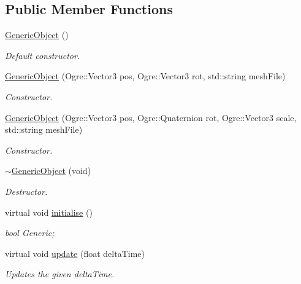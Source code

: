 \subsection*{Public Member Functions}
\begin{DoxyCompactItemize}
\item 
\hypertarget{class_objects_1_1_generic_object_abeb3e050cbd3e1458e0d73ccb5feb13b}{\hyperlink{class_objects_1_1_generic_object_abeb3e050cbd3e1458e0d73ccb5feb13b}{Generic\-Object} ()}\label{class_objects_1_1_generic_object_abeb3e050cbd3e1458e0d73ccb5feb13b}

\begin{DoxyCompactList}\small\item\em Default constructor. \end{DoxyCompactList}\item 
\hyperlink{class_objects_1_1_generic_object_af2dbae8570212439ea7c8b7dd8be5f4c}{Generic\-Object} (Ogre\-::\-Vector3 pos, Ogre\-::\-Vector3 rot, std\-::string mesh\-File)
\begin{DoxyCompactList}\small\item\em Constructor. \end{DoxyCompactList}\item 
\hyperlink{class_objects_1_1_generic_object_a3b2acd7559918edcbc74bd7d20da9763}{Generic\-Object} (Ogre\-::\-Vector3 pos, Ogre\-::\-Quaternion rot, Ogre\-::\-Vector3 scale, std\-::string mesh\-File)
\begin{DoxyCompactList}\small\item\em Constructor. \end{DoxyCompactList}\item 
\hypertarget{class_objects_1_1_generic_object_afb238b6fb112b4fb32e1180fab1fc68d}{\hyperlink{class_objects_1_1_generic_object_afb238b6fb112b4fb32e1180fab1fc68d}{$\sim$\-Generic\-Object} (void)}\label{class_objects_1_1_generic_object_afb238b6fb112b4fb32e1180fab1fc68d}

\begin{DoxyCompactList}\small\item\em Destructor. \end{DoxyCompactList}\item 
\hypertarget{class_objects_1_1_generic_object_a348bb3c00151b9824863a7b591b4b529}{virtual void \hyperlink{class_objects_1_1_generic_object_a348bb3c00151b9824863a7b591b4b529}{initialise} ()}\label{class_objects_1_1_generic_object_a348bb3c00151b9824863a7b591b4b529}

\begin{DoxyCompactList}\small\item\em bool Generic; \end{DoxyCompactList}\item 
virtual void \hyperlink{class_objects_1_1_generic_object_a57c85bdf2ceb1ffa1b85ec3aa51a631d}{update} (float delta\-Time)
\begin{DoxyCompactList}\small\item\em Updates the given delta\-Time. \end{DoxyCompactList}\end{DoxyCompactItemize}
